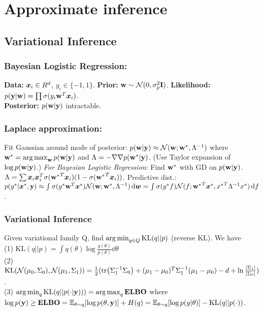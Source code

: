 
\section{Approximate inference}
\subsection{Variational Inference}
\subsubsection*{Bayesian Logistic Regression:}
\textbf{Data:} ${\bm{x}}_i \in R^d$, $y_i\in\{-1,1\}$.
\textbf{Prior:} ${\mathbf{w}}\sim\mathcal{N}(0,\sigma^2_p\mathbf{I})$.
\textbf{Likelihood:} $p({\mathbf{y}}|{\mathbf{w}}) = \prod\sigma(y_i{\mathbf{w}}^T{\bm{x}}_i)$.\\
\textbf{Posterior:} $p({\mathbf{w}}|{\mathbf{y}})$ intractable.
\subsubsection*{Laplace approximation:}
Fit Gaussian around mode of posterior: $p({\mathbf{w}}|{\mathbf{y}})\approx\mathcal{N}({\mathbf{w}};{{\mathbf{w}}^*},\Lambda^{-1})$ where ${{\mathbf{w}}^*} = \operatorname*{arg\,max}_{\mathbf{w}}{p({\mathbf{w}}|{\mathbf{y}})}$ and $\Lambda = -\nabla\nabla p({{\mathbf{w}}^*}|{\mathbf{y}})$. (Use Taylor expansion of $\log p({\mathbf{w}}|{\mathbf{y}})$.)
\emph{For Bayesian Logistic Regression}: Find ${{\mathbf{w}}^*}$ with GD on $p({\mathbf{w}}|{\mathbf{y}})$. $\Lambda = \sum {\bm{x}}_i{\bm{x}}_i^T\sigma({{\mathbf{w}}^*}^T {\bm{x}}_i)(1-\sigma({{\mathbf{w}}^*}^T {\bm{x}}_i))$. Predictive dist.: $p(y^*|{\bm{x}}^*,{\mathbf{y}}) \approx \int\sigma(y^*{\mathbf{w}}^T{\bm{x}}^*)\mathcal{N}({\mathbf{w}};{{\mathbf{w}}^*},\Lambda^{-1}) \dd{{\bm{w}}}   = \int\sigma(y^*f)\mathcal{N}(f;{{\mathbf{w}}^*}^T{\bm{x}}^*, {x^*}^T\Lambda^{-1}x^*) \dd{f}$.
\subsubsection*{Variational Inference}
Given variational family Q, find $\operatorname*{arg\,min}_{q\in Q}\mathrm{KL}(q||p)$ (reverse KL). We have\\
(1) $\mathrm{KL}(q||p) = \int q(\theta)\log\frac{q(\theta)}{p(\theta)}\dd{\theta}$\\ 
(2) $\mathrm{KL}(\mathcal{N}(\mu_0,\Sigma_0),\mathcal{N}(\mu_1,\Sigma_1)) = \frac{1}{2}(\tr(\Sigma_1^{-1}\Sigma_0)+(\mu_1-\mu_0)^T\Sigma_1^{-1}(\mu_1-\mu_0)-d+\ln\frac{|\Sigma_1|}{|\Sigma_0|})$.\\
(3) $\operatorname*{arg\,min}_{q}\mathrm{KL}(q||p(\cdot|{\mathbf{y}}))) = \operatorname*{arg\,max}_q \mathrm{\color{black}\mathbf{ELBO}}$ where $\log p({\mathbf{y}}) \geq \mathrm{\color{black}\mathbf{ELBO}} = \mathbb{E}_{\theta\sim q}[\log p(\theta, {\mathbf{y}})] + H(q) = \mathbb{E}_{\theta\sim q}[\log p(y|\theta)] - \mathrm{KL}(q||p(\cdot))$.

